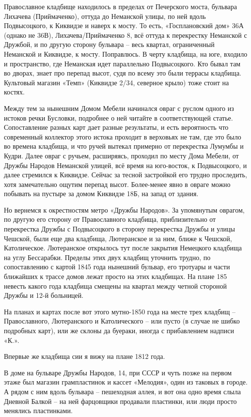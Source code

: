 Православное кладбище находилось в пределах от Печерского моста, бульвара Лихачева (Приймаченко), оттуда до Неманской улицы, по ней вдоль Подвысоцкого, к Киквидзе и наверх к мосту. То есть, «Госплановский дом» 36А (однако не 36В), Лихачева/Приймаченко 8, всё оттуда к перекрестку Неманской с Дружбой, и по другую сторону бульвара – весь квартал, ограниченный Неманской и Киквидзе, к мосту. Поправлюсь. В черту кладбища, на юге, входило и пространство, где Неманская идет параллельно Подвысоцкого. Кто бывал там во дворах, знает про перепад высот, судя по всему это были террасы кладбища. Культовый магазин «Темп» (Киквидзе 2/34, северное крыло) тоже стоит на костях.

Между тем за нынешним Домом Мебели начинался овраг с руслом одного из истоков речки Бусловки, подробнее о ней читайте в соответствующей статье. Сопоставление разных карт дает разные результаты, и есть вероятность что современный коллектор этого истока проходит в верховьях не там, где это было во времена кладбища, и что ручей вытекал примерно от перекрестка Лумумбы и Кудри. Далее овраг с ручьем, расширяясь, проходил по месту Дома Мебели, от Дружбы Народов Неманской улицей, всё время на юго-восток, к Подвысоцкого, и далее стремился к Киквидзе. Сейчас за тесной застройкой его трудно проследить, хотя замечательно ощутим перепад высот. Более-менее явно в овраге можно побывать на пустыре за домом Киквидзе 18Б, на запад от здания.

Но вернемся к окрестностям метро «Дружбы Народов». За упомянутым оврагом, по другую его сторону от Православного кладбища, приблизительно от перекрестка Дружбы с Подвысоцкого в сторону перекрестка Дружбы и улицы Чешской, были еще два кладбища, Лютеранское и за ним, ближе к Чешской, Католическое. Лютеранское открылось тут после закрытия Немецкого кладбища на углу Бессарабки. Пределы этих двух кладбищ уточнить трудно, по сопоставлению с картой 1845 года нынешний бульвар, его тротуары и части ближайших к трассе домов лежат просто на этих кладбищах. На плане 185 невесть какого года кладбища смещены на квартал между четной стороной Дружбы и 12-й больницей.

На планах и картах после вот этого мутно-1850 года на месте трех кладбищ – Православного, Лютеранского и Католического – или пусто (в случае не шибко подробных карт), или же склоны да буераки, иногда с прибавлением надписи «К.». 

Впервые же кладбища сии я вижу на плане 1812 года.

В доме на бульваре Дружбы Народов, 14, при СССР и чуть позже на первом этаже был магазин грампластинок и кассет «Мелодия», один из таковых в городе. А рядом с ним вдоль бульвара – пешеходная аллея, и вот она одно время слыла Дневной Балкой – на ней фарцовщики продавали пластинки, или люди просто менялись пластинками.\\

